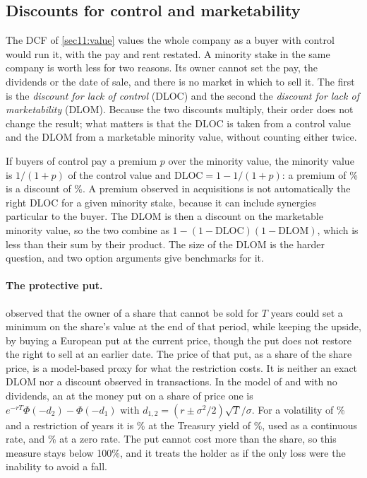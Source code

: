 \begin{chapterrefs}
\FloatBarrier
\section{Discounts for control and marketability}
\label{sec11:discounts}

The DCF of \cref{sec11:value} values the whole company as a buyer with control would run it, with the
pay and rent restated. A minority stake in the same company is worth less for two reasons. Its owner
cannot set the pay, the dividends or the date of sale, and there is no market in which to sell it.
The first is the \emph{discount for lack of control} (DLOC) and the second the \emph{discount for
lack of marketability} (DLOM). Because the two discounts multiply, their order does not change the
result; what matters is that the DLOC is taken from a control value and the DLOM from a marketable
minority value, without counting either twice.

If buyers of control pay a premium $p$ over the minority value, the minority value is $1/(1+p)$ of
the control value and $\mathrm{DLOC}=1-1/(1+p)$: a premium of \dmCp\% is a discount of \dmDloc\%. A
premium observed in acquisitions is not automatically the right DLOC for a given minority stake,
because it can include synergies particular to the buyer. The
DLOM is then a discount on the marketable minority value, so the two combine as
$1-(1-\mathrm{DLOC})(1-\mathrm{DLOM})$, which is less than their sum by their product. The size of the DLOM
is the harder question, and two option arguments give benchmarks for it.

\paragraph{The protective put.}
\textcite{chaffe1993} observed that the owner of a share that cannot be sold for $T$ years could
set a minimum on the share's value at the end of that period, while keeping the upside, by buying a
European put at the current price, though
the put does not restore the right to sell at an earlier date. The price of that put, as a share of the
share price, is a model-based proxy for what the restriction costs. It is neither an exact DLOM nor a
discount observed in transactions. In the model of
\textcite{black1973} and \textcite{merton1973} with no dividends, an at the money put on a share of
price one is $e^{-rT}\Phi(-d_2)-\Phi(-d_1)$ with $d_{1,2}=(r\pm\sigma^2/2)\sqrt T/\sigma$. For a volatility of
\dmSig\% and a restriction of \dmT{} years it is \dmChaffe\% at the Treasury yield of \wkRf\%, used as a continuous rate, and
\dmChaffeZero\% at a zero rate. The put cannot cost more than the share, so this measure stays below
100\%, and it treats the holder as if the only loss were the inability to avoid a fall.


\end{chapterrefs}
